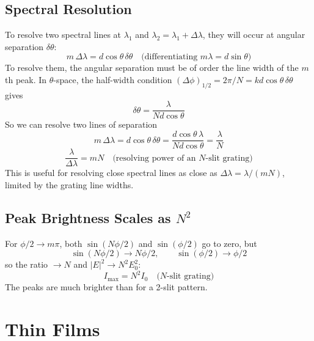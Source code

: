 \documentclass[11pt]{report}
\begin{document}
\subsection*{Spectral Resolution}

To resolve two spectral lines at $\lambda_1$ and $\lambda_2 = \lambda_1 + \Delta\lambda$, they will occur at angular separation $\delta\theta$:
\begin{equation}
m\,\Delta\lambda = d\cos\theta\,\delta\theta \quad \text{(differentiating } m\lambda = d\sin\theta\text{)}
\end{equation}
To resolve them, the angular separation must be of order the line width of the $m$th peak. In $\theta$-space, the half-width condition $(\Delta\phi)_{1/2} = 2\pi/N = kd\cos\theta\,\delta\theta$ gives
\begin{equation}
\delta\theta = \frac{\lambda}{N d\cos\theta}
\end{equation}
So we can resolve two lines of separation
\begin{equation}
m\,\Delta\lambda = d\cos\theta\,\delta\theta = \frac{d\cos\theta\,\lambda}{Nd\cos\theta} = \frac{\lambda}{N}
\end{equation}
\begin{equation}
\boxed{\frac{\lambda}{\Delta\lambda} = mN \quad \text{(resolving power of an $N$-slit grating)}}
\end{equation}
This is useful for resolving close spectral lines as close as $\Delta\lambda = \lambda/(mN)$, limited by the grating line widths.

\subsection*{Peak Brightness Scales as $N^2$}

For $\phi/2 \to m\pi$, both $\sin(N\phi/2)$ and $\sin(\phi/2)$ go to zero, but
\begin{equation}
\sin(N\phi/2) \to N\phi/2, \qquad \sin(\phi/2) \to \phi/2
\end{equation}
so the ratio $\to N$ and $|E|^2 \to N^2 E_0^2$:
\begin{equation}
\boxed{I_{\max} = N^2 I_0 \quad \text{($N$-slit grating)}}
\end{equation}
The peaks are much brighter than for a 2-slit pattern.

\section{Thin Films}
\end{document}
